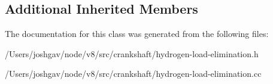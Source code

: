 \subsection*{Additional Inherited Members}


The documentation for this class was generated from the following files\+:\begin{DoxyCompactItemize}
\item 
/\+Users/joshgav/node/v8/src/crankshaft/hydrogen-\/load-\/elimination.\+h\item 
/\+Users/joshgav/node/v8/src/crankshaft/hydrogen-\/load-\/elimination.\+cc\end{DoxyCompactItemize}
